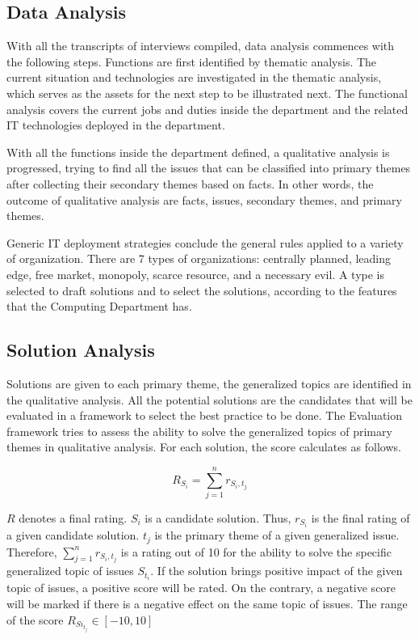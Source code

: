 \subsection{Data Analysis}
With all the transcripts of interviews compiled, data analysis commences with the following steps. 
Functions are first identified by thematic analysis. The current situation and technologies are investigated in the thematic analysis, which serves as the assets for the next step to be illustrated next. The functional analysis covers the current jobs and duties inside the department and the related IT technologies deployed in the department.

With all the functions inside the department defined, a qualitative analysis is progressed, trying to find all the issues that can be classified into primary themes after collecting their secondary themes based on facts. In other words, the outcome of qualitative analysis are facts, issues, secondary themes, and primary themes.

Generic IT deployment strategies conclude the general rules applied to a variety of organization. There are 7 types of organizations: centrally planned, leading edge, free market, monopoly, scarce resource, and a necessary evil. A type is selected to draft solutions and to select the solutions, according to the features that the Computing Department has.

\subsection{Solution Analysis}
Solutions are given to each primary theme, the generalized topics are identified in the qualitative analysis. All the potential solutions are the candidates that will be evaluated in a framework to select the best practice to be done.
The Evaluation framework tries to assess the ability to solve the generalized topics of primary themes in qualitative analysis. For each solution, the score calculates as follows.

$$
R_{S_i} = \sum_{j=1}^n{r_{S_i, t_j}}
$$

$R$ denotes a final rating. $S_i$ is a candidate solution. Thus, $r_{S_i}$ is the final rating of a given candidate solution. $t_j$ is the primary theme of a given generalized issue. Therefore, $\sum_{j=1}^n{r_{S_i, t_j}}$ is a rating out of 10 for the ability to solve the specific generalized topic of issues $S_{t_i}$. If the solution brings positive impact of the given topic of issues, a positive score will be rated. On the contrary, a negative score will be marked if there is a negative effect on the same topic of issues. The range of the score $R_{Si_{t_j}} \in [-10, 10]$


